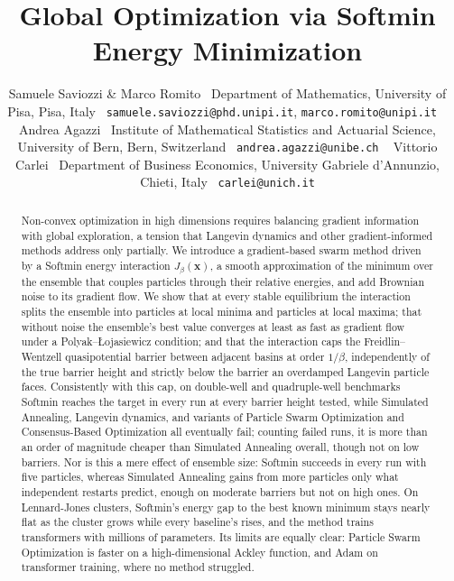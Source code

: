 \documentclass{article} %
\title{Global Optimization via Softmin\\ Energy Minimization}
\author{Samuele Saviozzi \& Marco Romito \
Department of Mathematics, University of Pisa, Pisa, Italy \
\texttt{samuele.saviozzi@phd.unipi.it}, \texttt{marco.romito@unipi.it} \
\And
Andrea Agazzi \
Institute of Mathematical Statistics and Actuarial Science, University of Bern, Bern, Switzerland \
\texttt{andrea.agazzi@unibe.ch} \
\And
Vittorio Carlei \
Department of Business Economics, University Gabriele d'Annunzio, Chieti, Italy \
\texttt{carlei@unich.it}
}
\theoremstyle{plain}
\theoremstyle{definition}
\theoremstyle{remark}
\newcommand{\xx}{\mathbf{x}}
\begin{document}
\maketitle

\begin{abstract}
    Non-convex optimization in high dimensions requires balancing gradient information with global exploration, a tension that Langevin dynamics and other gradient-informed methods address only partially. We introduce a gradient-based swarm method driven by a Softmin energy interaction $J_\beta(\xx)$, a smooth approximation of the minimum over the ensemble that couples particles through their relative energies, and add Brownian noise to its gradient flow. We show that at every stable equilibrium the interaction splits the ensemble into particles at local minima and particles at local maxima; that without noise the ensemble's best value converges at least as fast as gradient flow under a Polyak--\L{}ojasiewicz condition; and that the interaction caps the Freidlin--Wentzell quasipotential barrier between adjacent basins at order $1/\beta$, independently of the true barrier height and strictly below the barrier an overdamped Langevin particle faces. Consistently with this cap, on double-well and quadruple-well benchmarks Softmin reaches the target in every run at every barrier height tested, while Simulated Annealing, Langevin dynamics, and variants of Particle Swarm Optimization and Consensus-Based Optimization all eventually fail; counting failed runs, it is more than an order of magnitude cheaper than Simulated Annealing overall, though not on low barriers. Nor is this a mere effect of ensemble size: Softmin succeeds in every run with five particles, whereas Simulated Annealing gains from more particles only what independent restarts predict, enough on moderate barriers but not on high ones. On Lennard-Jones clusters, Softmin's energy gap to the best known minimum stays nearly flat as the cluster grows while every baseline's rises, and the method trains transformers with millions of parameters. Its limits are equally clear: Particle Swarm Optimization is faster on a high-dimensional Ackley function, and Adam on transformer training, where no method struggled.
\end{abstract}
\end{document}
